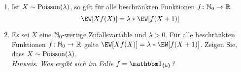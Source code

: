 \begin{exercisePage}
	\begin{homework}
		\begin{enumerate}[leftmargin=*, nolistsep]
			\item Ist $X \sim \operatorname{Poisson}(\lambda)$, so gilt für alle beschränkten Funktionen $\abb{f}{\N_0}{\R}$ 
			\begin{equation*}
				\EW[X f(X)] = \lambda * \EW[f(X+1)]
			\end{equation*}
			\item Es sei $X$ eine $\mathbb{N}_0$-wertige Zufallsvariable und $\lambda > 0$. Für alle beschränkten Funktionen $\abb{f}{\N_0}{\R}$ gelte $\EW[X f(X)] = \lambda * \EW[f(X+1)]$. Zeigen Sie, dass $X \sim \operatorname{Poisson}(\lambda)$. \\
			\textit{Hinweis. Was ergibt sich im Falle $f = \one_{\menge{k}}$?}
		\end{enumerate}
	\end{homework}
	
	\pagebreak
	

\end{exercisePage}
